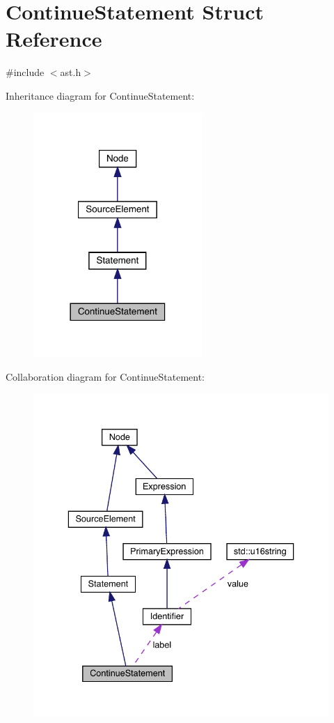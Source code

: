 \hypertarget{struct_continue_statement}{}\section{Continue\+Statement Struct Reference}
\label{struct_continue_statement}


{\ttfamily \#include $<$ast.\+h$>$}



Inheritance diagram for Continue\+Statement\+:\nopagebreak
\begin{figure}[H]
\begin{center}
\leavevmode
\includegraphics[width=182pt]{struct_continue_statement__inherit__graph}
\end{center}
\end{figure}


Collaboration diagram for Continue\+Statement\+:\nopagebreak
\begin{figure}[H]
\begin{center}
\leavevmode
\includegraphics[width=336pt]{struct_continue_statement__coll__graph}
\end{center}
\end{figure}
